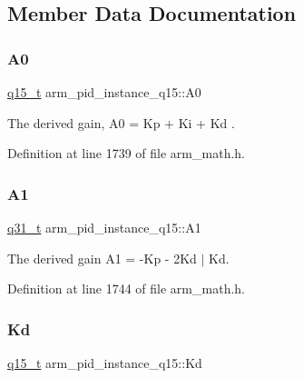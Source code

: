 \subsection{Member Data Documentation}
\mbox{\label{structarm__pid__instance__q15_ad77f3a2823c7f96de42c92a3fbf3246b}} 
\subsubsection{\texorpdfstring{A0}{A0}}
{\footnotesize\ttfamily \hyperlink{arm__math_8h_ab5a8fb21a5b3b983d5f54f31614052ea}{q15\+\_\+t} arm\+\_\+pid\+\_\+instance\+\_\+q15\+::\+A0}

The derived gain, A0 = Kp + Ki + Kd . 

Definition at line 1739 of file arm\+\_\+math.\+h.

\mbox{\label{structarm__pid__instance__q15_a1b8412c517071962a9acfdc6778906ec}} 
\subsubsection{\texorpdfstring{A1}{A1}}
{\footnotesize\ttfamily \hyperlink{arm__math_8h_adc89a3547f5324b7b3b95adec3806bc0}{q31\+\_\+t} arm\+\_\+pid\+\_\+instance\+\_\+q15\+::\+A1}

The derived gain A1 = -\/\+Kp -\/ 2\+Kd $\vert$ Kd. 

Definition at line 1744 of file arm\+\_\+math.\+h.

\mbox{\label{structarm__pid__instance__q15_af5d4b53091f19eff7536636b7cc43111}} 
\subsubsection{\texorpdfstring{Kd}{Kd}}
{\footnotesize\ttfamily \hyperlink{arm__math_8h_ab5a8fb21a5b3b983d5f54f31614052ea}{q15\+\_\+t} arm\+\_\+pid\+\_\+instance\+\_\+q15\+::\+Kd}

